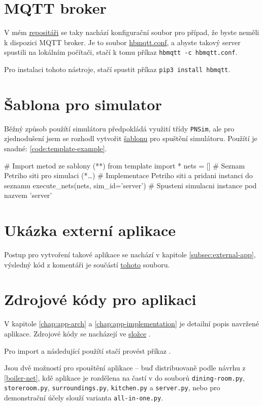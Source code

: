 \section{MQTT broker}

V mém \href{https://github.com/Danil-Grigorev/rt-sim-petry-net}{repositáři} se taky nachází konfigurační soubor pro případ, že byste neměli k dispozici MQTT broker. Je to soubor \href{https://github.com/Danil-Grigorev/rt-sim-petry-net/blob/master/hbmqtt.conf}{hbmqtt.conf}, a abyste takový server spustili na lokálním počítači, stačí k tomu příkaz \texttt{hbmqtt -c hbmqtt.conf}.

Pro instalaci tohoto nástroje, stačí spustit příkaz \texttt{pip3 install hbmqtt}.

\section{Šablona pro simulator}

Běžný způsob použítí simulátoru předpokládá využití třídy \texttt{PNSim}, ale pro zjednodušení jsem se rozhodl vytvořit \href{https://github.com/Danil-Grigorev/rt-sim-petry-net/blob/master/template.py}{šablonu} pro spuštění simulátoru. Použítí je snadné: \ref{code:template-example}.

\begin{python}
    # Import metod ze sablony (*\label{code:template-example}*)
    from template import *
    nets = [] # Seznam Petriho siti pro simulaci
    (*\ldots*) # Implementace Petriho siti a pridani instanci do seznamu
    execute_nets(nets, sim_id='server') # Spusteni simulacni instance pod nazvem 'server'
\end{python}

\section{Ukázka externí aplikace}
\label{sec:external-app-example}

Postup pro vytvoření takové aplikace se nachází v kapitole \ref{subsec:external-app}, výsledný kód z komentáři je součástí \href{https://github.com/Danil-Grigorev/rt-sim-petry-net/blob/master/temperature_logger.py}{tohoto} souboru.

\section{Zdrojové kódy pro aplikaci}

V kapitole \ref{chap:app-arch} a \ref{chap:app-implementation} je detailní popis navržené aplikace. Zdrojové kódy se nacházejí ve \href{https://github.com/Danil-Grigorev/rt-sim-petry-net/tree/master/sample_nets}{složce} .

Pro import a následující použítí stačí provést příkaz .

Jsou dvě možností pro spouštění aplikace -- buď distribuovaně podle návrhu z \ref{boiler-net}, kdě aplikace je rozdělena na častí v do souborů \texttt{dining-room.py}, \texttt{storeroom.py}, \texttt{surroundings.py}, \texttt{kitchen.py} a \texttt{server.py}, nebo pro demonstrační účely slouží varianta \texttt{all-in-one.py}.
